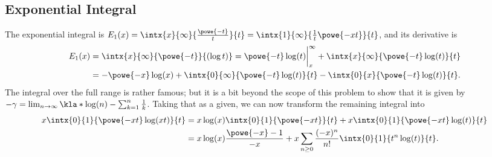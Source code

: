 \documentclass[english, parskip=full]{scrartcl}
\begin{document}
\subsection{Exponential Integral}
The exponential integral is $E_1(x) = \intx{x}{\infty}{\frac{\powe{-t}}{t}}{t} = \intx{1}{\infty}{\frac{1}{t} \powe{-xt}}{t}$, and its derivative is
%
\begin{align}
E_1(x) &= \intx{x}{\infty}{\powe{-t}}{(\log t)} = \powe{-t}\log (t) \bigg\vert_x^\infty + \intx{x}{\infty}{\powe{-t} \log(t)}{t} \\
&= -\powe{-x}\log(x) + \intx{0}{\infty}{\powe{-t} \log(t)}{t} - \intx{0}{x}{\powe{-t}\log(t)}{t}.
\end{align}
The integral over the full range is rather famous; but it is a bit beyond the scope of this problem to show that it is given by $-\gamma = \lim_{n\rightarrow\infty} \kla*{\log(n) - \sum_{k=1}^n \frac{1}{k}}$. %
Taking that as a given, we can now transform the remaining integral into
\begin{align}
x\intx{0}{1}{\powe{-xt}\log(xt)}{t} &= x\log(x) \intx{0}{1}{\powe{-xt}}{t} + x\intx{0}{1}{\powe{-xt} \log(t)}{t}\\
&= x\log(x) \frac{\powe{-x}-1}{-x} + x \sum_{n\ge 0} \frac{(-x)^n}{n!} \intx{0}{1}{t^n \log(t)}{t}.
\end{align}
\end{document}
